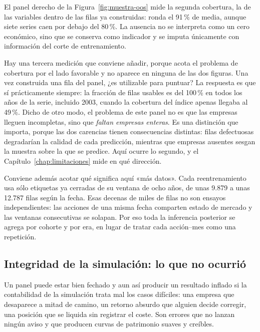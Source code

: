 \begin{table}[htbp]
  \centering
  \small
  \caption{Dimensión efectiva de la muestra fuera de muestra.}
  \label{tab:muestra-oos}
  
  \resizebox{\textwidth}{!}{}
\end{table}

El panel derecho de la Figura~\ref{fig:muestra-oos} mide la segunda cobertura, la de las variables
dentro de las filas ya construidas: ronda el 91\,\% de media, aunque siete series caen por debajo
del 80\,\%. La ausencia no se interpreta como un cero económico, sino que se conserva como indicador
y se imputa únicamente con información del corte de entrenamiento.

Hay una tercera medición que conviene añadir, porque acota el problema de cobertura por el lado
favorable y no aparece en ninguna de las dos figuras. Una vez construida una fila del panel, ¿es
utilizable para puntuar? La respuesta es que sí prácticamente siempre: la fracción de filas usables
es del 100\,\% en todos los años de la serie, incluido 2003, cuando la cobertura del índice
apenas llegaba al 49\,\%. Dicho de otro modo, el problema de este panel no es que las empresas
lleguen incompletas, sino que \emph{faltan empresas enteras}. Es una distinción que importa, porque
las dos carencias tienen consecuencias distintas: filas defectuosas degradarían la calidad de cada
predicción, mientras que empresas ausentes sesgan la muestra sobre la que se predice. Aquí ocurre lo
segundo, y el Capítulo~\ref{chap:limitaciones} mide en qué dirección.

Conviene además acotar qué significa aquí «más datos». Cada reentrenamiento usa sólo etiquetas ya
cerradas de su ventana de ocho años, de unas 9.879 a unas 12.787 filas según la fecha. Esas decenas
de miles de filas no son ensayos independientes: las acciones de una misma fecha comparten estado de
mercado y las ventanas consecutivas se solapan. Por eso toda la inferencia posterior se agrega por
cohorte y por era, en lugar de tratar cada acción--mes como una repetición.

\subsection{Integridad de la simulación: lo que no ocurrió}

Un panel puede estar bien fechado y aun así producir un resultado inflado si la contabilidad de la
simulación trata mal los casos difíciles: una empresa que desaparece a mitad de camino, un retorno
absurdo que alguien decide corregir, una posición que se liquida sin registrar el coste. Son errores
que no lanzan ningún aviso y que producen curvas de patrimonio suaves y creíbles.


